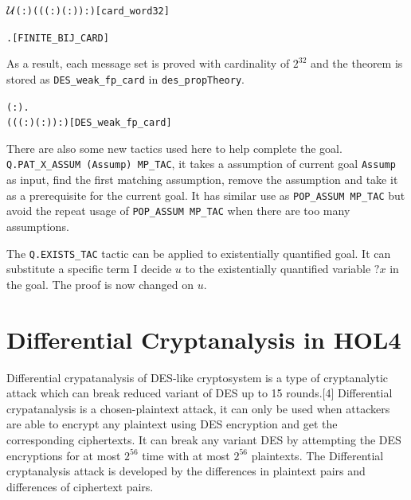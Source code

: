 \documentclass{article}
\begin{document}
\begin{alltt}
\HOLTokenTurnstile{}  \ensuremath{{\cal{U}}}(:) \HOLSymConst{=} ((( :) \HOLSymConst{\HOLTokenExp{}} ( :)) :)\hfill{[card_word32]}
\end{alltt}

\begin{alltt}
\HOLTokenTurnstile{} \HOLSymConst{\HOLTokenForall{}}  .   \HOLSymConst{\HOLTokenConj{}}     \HOLSymConst{\HOLTokenImp{}}   \HOLSymConst{=}  \hfill{[FINITE_BIJ_CARD]}
\end{alltt}

As a result, each message set is proved with cardinality of $2^{32}$ and the theorem is stored as
\verb|DES_weak_fp_card| in \verb|des_propTheory|.

\begin{alltt}
\HOLTokenTurnstile{} \HOLSymConst{\HOLTokenForall{}}( : \HOLTokenMap{} ).
        \HOLSymConst{\HOLTokenImp{}}   \HOLSymConst{=} ((( :) \HOLSymConst{\HOLTokenExp{}} ( :)) :)\hfill{[DES_weak_fp_card]}
\end{alltt}

There are also some new tactics used here to help complete the goal. \\
\verb|Q.PAT_X_ASSUM (Assump) MP_TAC|, it takes a
assumption of current goal \verb|Assump| as input, find the first matching assumption, remove the assumption and take it
as a prerequisite for the current goal. It has similar use as \verb|POP_ASSUM MP_TAC| but avoid the repeat usage
of \verb|POP_ASSUM MP_TAC| when there are too many assumptions.

The \verb|Q.EXISTS_TAC| tactic can be applied to existentially quantified goal. It can substitute a specific term I decide $u$
to the existentially quantified variable $?x$ in the goal. The proof is now changed on $u$.

\section{Differential Cryptanalysis in HOL4}
Differential crypatanalysis of DES-like cryptosystem is a type of cryptanalytic attack which can break reduced variant
of DES up to 15 rounds.[4] Differential crypatanalysis is a chosen-plaintext attack, it can only be used when attackers
are able to encrypt any plaintext using DES encryption and get the corresponding ciphertexts. It can break any variant DES
by attempting the DES encryptions for at most $2^{56}$ time with at most $2^{56}$ plaintexts. The Differential cryptanalysis
attack is developed by the differences in plaintext pairs and differences of ciphertext pairs.
\end{document}

